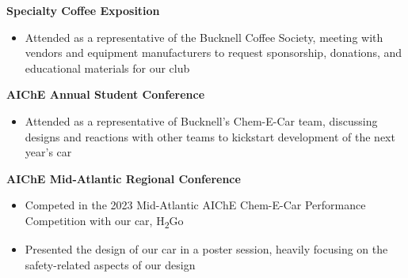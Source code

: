 \documentclass{article}
\begin{document}
\textbf{Specialty Coffee Exposition}  \hfill {}
\begin{itemize}[noitemsep,topsep=2pt]
    \item Attended as a representative of the Bucknell Coffee Society, meeting with vendors and equipment manufacturers to request sponsorship, donations, and educational materials for our club
\end{itemize}

\textbf{AIChE Annual Student Conference}  \hfill {}
\begin{itemize}[noitemsep,topsep=2pt]
    \item Attended as a representative of Bucknell's Chem-E-Car team, discussing designs and reactions with other teams to kickstart development of the next year's car
\end{itemize}

\textbf{AIChE Mid-Atlantic Regional Conference}  \hfill {}
\begin{itemize}[noitemsep,topsep=2pt]
    \item Competed in the 2023 Mid-Atlantic AIChE Chem-E-Car Performance Competition with our car, H\textsubscript{2}Go
    \item Presented the design of our car in a poster session, heavily focusing on the safety-related aspects of our design
\end{itemize}




\end{document}
